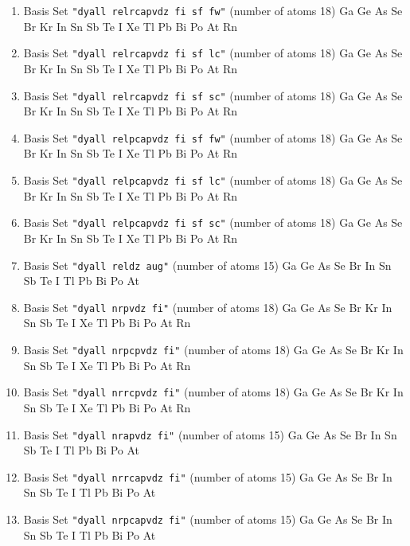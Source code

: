 \begin{enumerate}
\item Basis Set \verb#"dyall relrcapvdz fi sf fw"# (number of atoms 18)  \newline 
  Ga Ge As Se Br Kr In Sn Sb Te I Xe Tl Pb Bi Po At Rn


\item Basis Set \verb#"dyall relrcapvdz fi sf lc"# (number of atoms 18)  \newline 
  Ga Ge As Se Br Kr In Sn Sb Te I Xe Tl Pb Bi Po At Rn


\item Basis Set \verb#"dyall relrcapvdz fi sf sc"# (number of atoms 18)  \newline 
  Ga Ge As Se Br Kr In Sn Sb Te I Xe Tl Pb Bi Po At Rn


\item Basis Set \verb#"dyall relpcapvdz fi sf fw"# (number of atoms 18)  \newline 
  Ga Ge As Se Br Kr In Sn Sb Te I Xe Tl Pb Bi Po At Rn


\item Basis Set \verb#"dyall relpcapvdz fi sf lc"# (number of atoms 18)  \newline 
  Ga Ge As Se Br Kr In Sn Sb Te I Xe Tl Pb Bi Po At Rn


\item Basis Set \verb#"dyall relpcapvdz fi sf sc"# (number of atoms 18)  \newline 
  Ga Ge As Se Br Kr In Sn Sb Te I Xe Tl Pb Bi Po At Rn


\item Basis Set \verb#"dyall reldz aug"# (number of atoms 15)  \newline 
  Ga Ge As Se Br In Sn Sb Te I Tl Pb Bi Po At


\item Basis Set \verb#"dyall nrpvdz fi"# (number of atoms 18)  \newline 
  Ga Ge As Se Br Kr In Sn Sb Te I Xe Tl Pb Bi Po At Rn


\item Basis Set \verb#"dyall nrpcpvdz fi"# (number of atoms 18)  \newline 
  Ga Ge As Se Br Kr In Sn Sb Te I Xe Tl Pb Bi Po At Rn


\item Basis Set \verb#"dyall nrrcpvdz fi"# (number of atoms 18)  \newline 
  Ga Ge As Se Br Kr In Sn Sb Te I Xe Tl Pb Bi Po At Rn


\item Basis Set \verb#"dyall nrapvdz fi"# (number of atoms 15)  \newline 
  Ga Ge As Se Br In Sn Sb Te I Tl Pb Bi Po At


\item Basis Set \verb#"dyall nrrcapvdz fi"# (number of atoms 15)  \newline 
  Ga Ge As Se Br In Sn Sb Te I Tl Pb Bi Po At


\item Basis Set \verb#"dyall nrpcapvdz fi"# (number of atoms 15)  \newline 
  Ga Ge As Se Br In Sn Sb Te I Tl Pb Bi Po At

\end{enumerate}

\fussy


